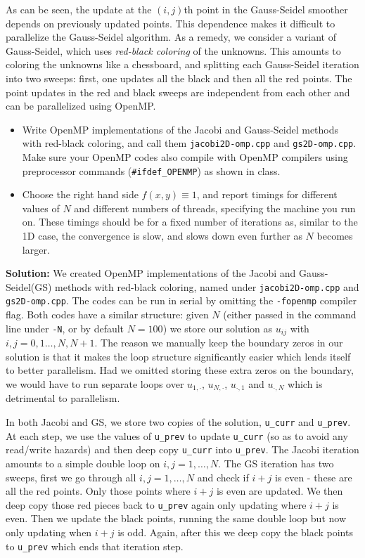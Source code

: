 \documentclass[10pt]{article}
\begin{document}
\begin{enumerate}
As can be seen, the update at the $(i,j)$th point in the Gauss-Seidel smoother depends on previously updated points. This dependence makes it difficult to parallelize the Gauss-Seidel algorithm. As a remedy, we consider a variant of Gauss-Seidel, which uses \textit{red-black coloring} of the unknowns. This amounts to coloring the unknowns like a chessboard, and splitting each Gauss-Seidel iteration into two sweeps: first, one updates all the black and then all the red points. The point updates in the red and black sweeps are independent from each other and can be parallelized using OpenMP.
\begin{itemize}
	\item Write OpenMP implementations of the Jacobi and Gauss-Seidel methods with red-black coloring, and call them \texttt{jacobi2D-omp.cpp} and \texttt{gs2D-omp.cpp}. Make sure your OpenMP codes also compile with OpenMP compilers using preprocessor commands (\texttt{\#ifdef\_OPENMP}) as shown in class.
	
	\item Choose the right hand side $f(x,y) \equiv 1$, and report timings for different values of $N$ and different numbers of threads, specifying the machine you run on. These timings should be for a fixed number of iterations as, similar to the 1D case, the convergence is slow, and slows down even further as $N$ becomes larger. 
\end{itemize}


\textbf{Solution:} We created OpenMP implementations of the Jacobi and Gauss-Seidel(GS) methods with red-black coloring, named under \texttt{jacobi2D-omp.cpp} and \texttt{gs2D-omp.cpp}. The codes can be run in serial by omitting the \texttt{-fopenmp} compiler flag. Both codes have a similar structure: given $N$ (either passed in the command line under \texttt{-N}, or by default $N=100$) we store our solution as $u_{ij}$ with $i,j=0,1\dotsc,N,N+1$. The reason we manually keep the boundary zeros in our solution is that it makes the loop structure significantly easier which lends itself to better parallelism. Had we omitted storing these extra zeros on the boundary, we would have to run separate loops over $u_{1,\cdot}$, $u_{N,\cdot}$, $u_{\cdot,1}$ and $u_{\cdot,N}$ which is detrimental to parallelism.

In both Jacobi and GS, we store two copies of the solution, \texttt{u\_curr} and \texttt{u\_prev}. At each step, we use the values of \texttt{u\_prev} to update \texttt{u\_curr} (so as to avoid any read/write hazards) and then deep copy \texttt{u\_curr} into \texttt{u\_prev}. The Jacobi iteration amounts to a simple double loop on $i,j=1,\dotsc,N$. The GS iteration has two sweeps, first we go through all $i,j=1,\dotsc,N$ and check if $i+j$ is even - these are all the red points. Only those points where $i+j$ is even are updated. We then deep copy those red pieces back to \texttt{u\_prev} again only updating where $i+j$ is even. Then we update the black points, running the same double loop but now only updating when $i+j$ is odd. Again, after this we deep copy the black points to \texttt{u\_prev} which ends that iteration step.


\end{enumerate}
\end{document}
